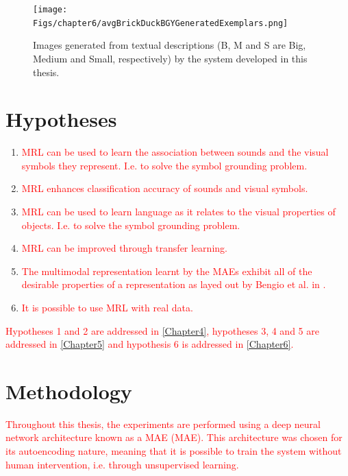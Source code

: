 \begin{figure}
\centering

\texttt{[image: Figs/chapter6/avgBrickDuckBGYGeneratedExemplars.png]}
\caption{Images generated from textual descriptions (B, M and S are Big, Medium and Small, respectively) by the system developed in this thesis.}
\label{fig:mrl_teaser}
\end{figure}

\section{Hypotheses}


\begin{enumerate}

	\item \textcolor{red}{\ac{MRL} can be used to learn the association between sounds and the visual symbols they represent. I.e. to solve the symbol grounding problem.}
	\item \textcolor{red}{\ac{MRL} enhances classification accuracy of sounds and visual symbols.}
	\item \textcolor{red}{\ac{MRL} can be used to learn language as it relates to the visual properties of objects. I.e. to solve the symbol grounding problem.}
	\item \textcolor{red}{\ac{MRL} can be improved through transfer learning.}
	\item \textcolor{red}{The multimodal representation learnt by the \acp{MAE} exhibit all of the desirable properties of a representation as layed out by Bengio et al. in \cite{repRev}.}		
	\item \textcolor{red}{It is possible to use \ac{MRL} with real data.}
	
\end{enumerate}

\textcolor{red}{Hypotheses 1 and 2 are addressed in \autoref{Chapter4}, hypotheses 3, 4 and 5 are addressed in \autoref{Chapter5} and hypothesis 6 is addressed in \autoref{Chapter6}.} 


\section{Methodology}
\textcolor{red}{Throughout this thesis, the experiments are performed using a deep neural network architecture known as a \acl{MAE} (\ac{MAE}). This architecture was chosen for its autoencoding nature, meaning that it is possible to train the system without human intervention, i.e. through unsupervised learning.} 

